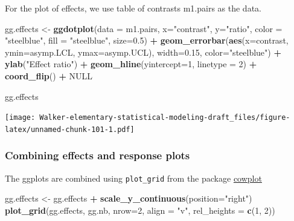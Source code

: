 \documentclass[]{book}
\newenvironment{Shaded}{\begin{snugshade}}{\end{snugshade}}
\newcommand{\DataTypeTok}[1]{\textcolor[rgb]{0.13,0.29,0.53}{#1}}
\newcommand{\DecValTok}[1]{\textcolor[rgb]{0.00,0.00,0.81}{#1}}
\newcommand{\FloatTok}[1]{\textcolor[rgb]{0.00,0.00,0.81}{#1}}
\newcommand{\KeywordTok}[1]{\textcolor[rgb]{0.13,0.29,0.53}{\textbf{#1}}}
\newcommand{\NormalTok}[1]{#1}
\newcommand{\OperatorTok}[1]{\textcolor[rgb]{0.81,0.36,0.00}{\textbf{#1}}}
\newcommand{\OtherTok}[1]{\textcolor[rgb]{0.56,0.35,0.01}{#1}}
\newcommand{\StringTok}[1]{\textcolor[rgb]{0.31,0.60,0.02}{#1}}
\begin{document}
For the plot of effects, we use table of contrasts m1.pairs as the data.

\begin{Shaded}
\begin{Highlighting}[]
\NormalTok{gg.effects <-}\StringTok{ }\KeywordTok{ggdotplot}\NormalTok{(}\DataTypeTok{data =}\NormalTok{ m1.pairs,}
                        \DataTypeTok{x=}\StringTok{"contrast"}\NormalTok{, }
                        \DataTypeTok{y=}\StringTok{"ratio"}\NormalTok{, }
                        \DataTypeTok{color =} \StringTok{"steelblue"}\NormalTok{,}
                        \DataTypeTok{fill =} \StringTok{"steelblue"}\NormalTok{,}
                        \DataTypeTok{size=}\FloatTok{0.5}\NormalTok{) }\OperatorTok{+}
\StringTok{  }
\StringTok{  }\KeywordTok{geom_errorbar}\NormalTok{(}\KeywordTok{aes}\NormalTok{(}\DataTypeTok{x=}\NormalTok{contrast, }
                    \DataTypeTok{ymin=}\NormalTok{asymp.LCL, }
                    \DataTypeTok{ymax=}\NormalTok{asymp.UCL),}
                \DataTypeTok{width=}\FloatTok{0.15}\NormalTok{, }
                \DataTypeTok{color=}\StringTok{"steelblue"}\NormalTok{) }\OperatorTok{+}
\StringTok{  }\KeywordTok{ylab}\NormalTok{(}\StringTok{"Effect ratio"}\NormalTok{) }\OperatorTok{+}
\StringTok{  }\KeywordTok{geom_hline}\NormalTok{(}\DataTypeTok{yintercept=}\DecValTok{1}\NormalTok{, }\DataTypeTok{linetype =} \DecValTok{2}\NormalTok{) }\OperatorTok{+}
\StringTok{  }\KeywordTok{coord_flip}\NormalTok{() }\OperatorTok{+}\StringTok{ }
\StringTok{  }
\StringTok{  }\OtherTok{NULL}

\NormalTok{gg.effects}
\end{Highlighting}
\end{Shaded}

\texttt{[image: Walker-elementary-statistical-modeling-draft\_files/figure-latex/unnamed-chunk-101-1.pdf]}

\hypertarget{combining-effects-and-response-plots}{%
\subsubsection{Combining effects and response plots}\label{combining-effects-and-response-plots}}

The ggplots are combined using \texttt{plot\_grid} from the package \href{https://cran.r-project.org/web/packages/cowplot/vignettes/introduction.html}{cowplot}

\begin{Shaded}
\begin{Highlighting}[]
\NormalTok{gg.effects <-}\StringTok{ }\NormalTok{gg.effects }\OperatorTok{+}\StringTok{ }\KeywordTok{scale_y_continuous}\NormalTok{(}\DataTypeTok{position=}\StringTok{"right"}\NormalTok{)}
\KeywordTok{plot_grid}\NormalTok{(gg.effects, gg.nb, }\DataTypeTok{nrow=}\DecValTok{2}\NormalTok{, }\DataTypeTok{align =} \StringTok{"v"}\NormalTok{, }\DataTypeTok{rel_heights =} \KeywordTok{c}\NormalTok{(}\DecValTok{1}\NormalTok{, }\DecValTok{2}\NormalTok{))}
\end{Highlighting}
\end{Shaded}
\end{document}
